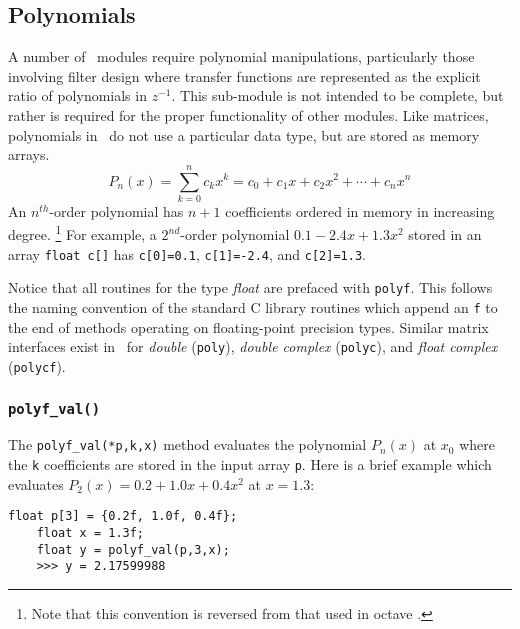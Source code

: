 \subsection{Polynomials}
\label{module:math:poly}
A number of \liquid\ modules require polynomial manipulations, particularly
those involving filter design where transfer functions are represented as the
explicit ratio of polynomials in $z^{-1}$.
This sub-module is not intended to be complete, but rather is required for
the proper functionality of other modules.
Like matrices, polynomials in \liquid\ do not use a particular data type, but
are stored as memory arrays.
%
\begin{equation}
\label{eqn:math:poly:representation}
    P_n(x) = \sum_{k=0}^{n}{c_k x^k}
           = c_0 + c_1 x + c_2 x^2 + \cdots + c_n x^n
\end{equation}
%
An $n^{th}$-order polynomial has $n+1$ coefficients ordered in memory in
increasing degree.%
\footnote{Note that this convention is reversed from that used in octave
\cite{octave:web}.}
For example, a $2^{nd}$-order polynomial $0.1 -2.4x + 1.3x^2$ stored in
an array {\tt float c[]} has
{\tt c[0]=0.1},
{\tt c[1]=-2.4}, and
{\tt c[2]=1.3}.

Notice that all routines for the type {\it float} are prefaced with
{\tt polyf}.
This follows the naming convention of the standard C library routines
which append an {\tt f} to the end of methods operating on
floating-point precision types.
Similar matrix interfaces exist in \liquid\ for
{\it double} ({\tt poly}),
{\it double complex} ({\tt polyc}), and
{\it float complex} ({\tt polycf}).


\subsubsection{{\tt polyf\_val()}}
\label{module:math:poly:polyf_val}
The {\tt polyf\_val(*p,k,x)} method evaluates the polynomial $P_n(x)$ at
$x_0$ where the {\tt k} coefficients are stored in the input array
{\tt p}.
Here is a brief example which evaluates $P_2(x) = 0.2 + 1.0x + 0.4x^2$
at $x=1.3$:
%
\begin{Verbatim}[fontsize=\small]
    float p[3] = {0.2f, 1.0f, 0.4f};
    float x = 1.3f;
    float y = polyf_val(p,3,x);
    >>> y = 2.17599988
\end{Verbatim}


